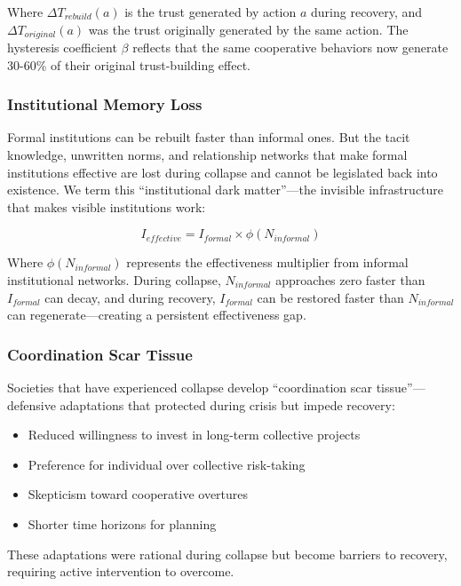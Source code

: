\documentclass[11pt,letterpaper]{article}
\begin{document}
Where $\Delta T_{rebuild}(a)$ is the trust generated by action $a$ during recovery, and $\Delta T_{original}(a)$ was the trust originally generated by the same action. The hysteresis coefficient $\beta$ reflects that the same cooperative behaviors now generate 30-60\% of their original trust-building effect.

\subsubsection{Institutional Memory Loss}

Formal institutions can be rebuilt faster than informal ones. But the tacit knowledge, unwritten norms, and relationship networks that make formal institutions effective are lost during collapse and cannot be legislated back into existence. We term this ``institutional dark matter''---the invisible infrastructure that makes visible institutions work:

\begin{equation}
I_{effective} = I_{formal} \times \phi(N_{informal})
\label{eq:institutional_memory}
\end{equation}

Where $\phi(N_{informal})$ represents the effectiveness multiplier from informal institutional networks. During collapse, $N_{informal}$ approaches zero faster than $I_{formal}$ can decay, and during recovery, $I_{formal}$ can be restored faster than $N_{informal}$ can regenerate---creating a persistent effectiveness gap.

\subsubsection{Coordination Scar Tissue}

Societies that have experienced collapse develop ``coordination scar tissue''---defensive adaptations that protected during crisis but impede recovery:
\begin{itemize}
\item Reduced willingness to invest in long-term collective projects
\item Preference for individual over collective risk-taking
\item Skepticism toward cooperative overtures
\item Shorter time horizons for planning
\end{itemize}

These adaptations were rational during collapse but become barriers to recovery, requiring active intervention to overcome.
\end{document}
